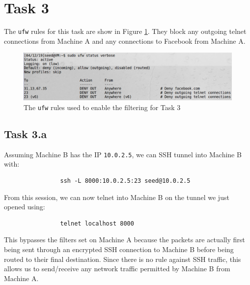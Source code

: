 \documentclass[12pt,letterpaper]{article}
\begin{document}
	\section*{Task 3}
		The \texttt{ufw} rules for this task are show in Figure \ref{fig:task-3-ufw-rules}. They block any outgoing telnet connections from Machine A and any connections to Facebook from Machine A.
		
		\begin{figure}
			\begin{center}
				\includegraphics[width=\linewidth]{task-3-ufw-rules}
			\end{center}
			\caption{The \texttt{ufw} rules used to enable the filtering for Task 3}
			\label{fig:task-3-ufw-rules}
		\end{figure}
	
		\subsection*{Task 3.a}
			Assuming Machine B has the IP \texttt{10.0.2.5}, we can SSH tunnel into Machine B with:
			
			\begin{verbatim}
				ssh -L 8000:10.0.2.5:23 seed@10.0.2.5
			\end{verbatim}
			
			From this session, we can now telnet into Machine B on the tunnel we just opened using:
			
			\begin{verbatim}
				telnet localhost 8000
			\end{verbatim}
			
			This bypasses the filters set on Machine A because the packets are actually first being sent through an encrypted SSH connection to Machine B before being routed to their final destination. Since there is no rule against SSH traffic, this allows us to send/receive any network traffic permitted by Machine B from Machine A.
\end{document}
